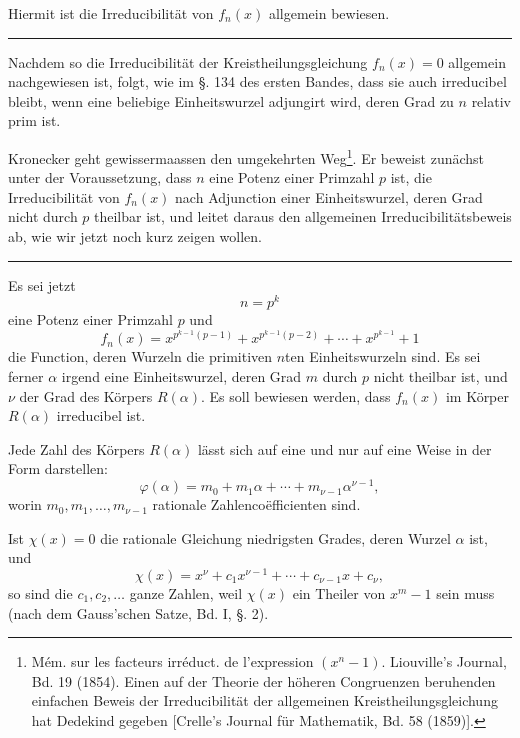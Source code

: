\documentclass[11pt]{article}
\begin{document}
Hiermit ist die Irreducibilität von $f_n(x)$ allgemein bewiesen.

\medskip\hrule\medskip

Nachdem so die Irreducibilität der Kreistheilungsgleichung $f_n(x)=0$ allgemein nachgewiesen ist, folgt, wie im §. 134 des ersten Bandes, dass sie auch irreducibel bleibt, wenn eine beliebige Einheitswurzel adjungirt wird, deren Grad zu $n$ relativ prim ist.

Kronecker geht gewissermaassen den umgekehrten Weg\footnote{Mém. sur les facteurs irréduct. de l'expression $(x^n-1)$. Liouville's Journal, Bd. 19 (1854). Einen auf der Theorie der höheren Congruenzen beruhenden einfachen Beweis der Irreducibilität der allgemeinen Kreistheilungsgleichung hat Dedekind gegeben [Crelle's Journal für Mathematik, Bd. 58 (1859)].}. Er beweist zunächst unter der Voraussetzung, dass $n$ eine Potenz einer Primzahl $p$ ist, die Irreducibilität von $f_n(x)$ nach Adjunction einer Einheitswurzel, deren Grad nicht durch $p$ theilbar ist, und leitet daraus den allgemeinen Irreducibilitätsbeweis ab, wie wir jetzt noch kurz zeigen wollen.

\medskip\hrule\medskip

Es sei jetzt
\[
n=p^k
\]
eine Potenz einer Primzahl $p$ und
\begin{equation}\tag{8}
f_n(x)=x^{p^{k-1}(p-1)}+x^{p^{k-1}(p-2)}+\cdots+x^{p^{k-1}}+1
\end{equation}
die Function, deren Wurzeln die primitiven $n$ten Einheitswurzeln sind. Es sei ferner $\alpha$ irgend eine Einheitswurzel, deren Grad $m$ durch $p$ nicht theilbar ist, und $\nu$ der Grad des Körpers $R(\alpha)$. Es soll bewiesen werden, dass $f_n(x)$ im Körper $R(\alpha)$ irreducibel ist.

Jede Zahl des Körpers $R(\alpha)$ lässt sich auf eine und nur auf eine Weise in der Form darstellen:
\begin{equation}\tag{9}
\varphi(\alpha)=m_0+m_1\alpha+\cdots+m_{\nu-1}\alpha^{\nu-1},
\end{equation}
worin $m_0,m_1,\ldots,m_{\nu-1}$ rationale Zahlencoëfficienten sind.

Ist $\chi(x)=0$ die rationale Gleichung niedrigsten Grades, deren Wurzel $\alpha$ ist, und
\begin{equation}\tag{10}
\chi(x)=x^\nu+c_1x^{\nu-1}+\cdots+c_{\nu-1}x+c_\nu,
\end{equation}
so sind die $c_1,c_2,\ldots$ ganze Zahlen, weil $\chi(x)$ ein Theiler von $x^m-1$ sein muss (nach dem Gauss'schen Satze, Bd. I, §. 2).
\end{document}
